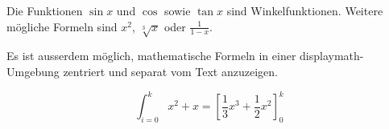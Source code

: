 \documentclass{article}
\begin{document}
  Die Funktionen
  $ \sin x$
  und
  \( \cos \)
  sowie
  \begin{math} \tan x \end{math}
  sind Winkelfunktionen. Weitere mögliche Formeln sind $ x^2 $, $ \sqrt[3]{x} $ oder $ \frac{1}{1-x} $.

  Es ist ausserdem möglich, mathematische Formeln in einer displaymath-Umgebung zentriert und separat vom Text anzuzeigen.

  \begin{displaymath}
    \int_{i=0}^k
      x^2 + x =
      \left[
        \frac{1}{3} x^3 + \frac{1}{2} x^2
      \right]_0^k
  \end{displaymath}
\end{document}
